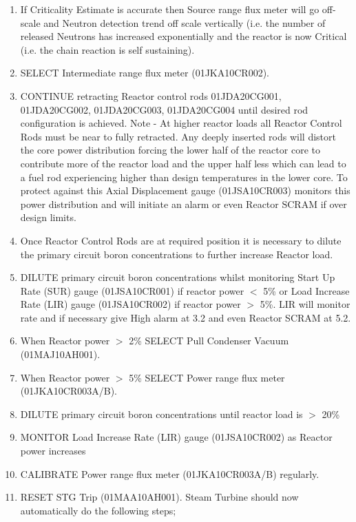 \documentclass[10pt,a4paper]{article}
\begin{document}
\begin{enumerate}
\item If Criticality Estimate is accurate then Source range flux meter will go off-scale and Neutron detection trend off scale vertically (i.e. the number of released Neutrons has increased exponentially and the reactor is now Critical (i.e. the chain reaction is self sustaining). 
\item SELECT Intermediate range flux meter (01JKA10CR002).
\item CONTINUE retracting Reactor control rods 01JDA20CG001, 01JDA20CG002, 01JDA20CG003, 01JDA20CG004 until desired rod configuration is achieved. Note - At higher reactor loads all Reactor Control Rods must be near to fully retracted. Any deeply inserted rods will distort the core power distribution forcing the lower half of the reactor core to contribute more of the reactor load and the upper half less which can lead to a fuel rod experiencing higher than design temperatures in the lower core.  To protect against this Axial Displacement gauge (01JSA10CR003) monitors this power distribution and will initiate an alarm or even Reactor SCRAM if over design limits.
\item Once Reactor Control Rods are at required position it is necessary to dilute the primary circuit boron concentrations to further increase Reactor load.
\item DILUTE primary circuit boron concentrations whilst monitoring Start Up Rate (SUR) gauge (01JSA10CR001) if reactor power $<$ 5\% or Load Increase Rate (LIR) gauge (01JSA10CR002) if reactor power $>$ 5\%. LIR will monitor rate and if necessary give High alarm at 3.2 and even Reactor SCRAM at 5.2.
\item When Reactor power $>$ 2\% SELECT Pull Condenser Vacuum (01MAJ10AH001).
\item When Reactor power $>$ 5\% SELECT Power range flux meter (01JKA10CR003A/B).
\item DILUTE primary circuit boron concentrations until reactor load is $>$ 20\%
\item MONITOR Load Increase Rate (LIR) gauge (01JSA10CR002) as Reactor power increases
\item CALIBRATE Power range flux meter (01JKA10CR003A/B) regularly.
\item RESET STG Trip (01MAA10AH001). Steam Turbine should now automatically do the following steps;
\end{enumerate}
\end{document}
